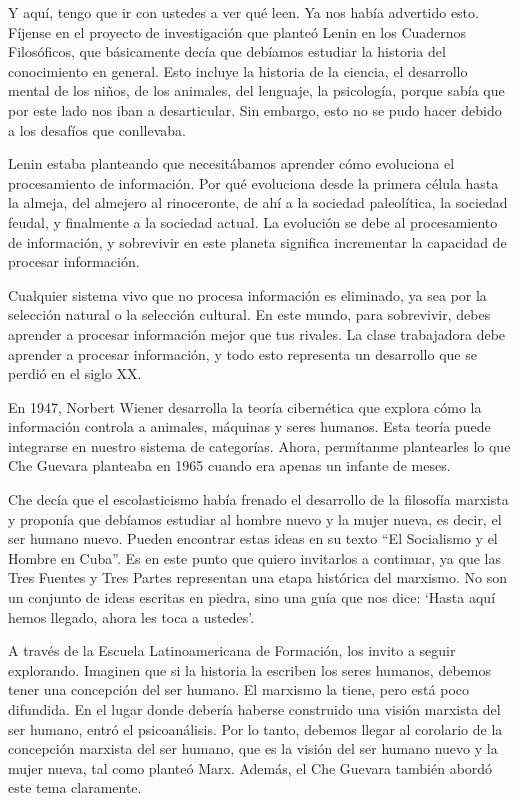 \documentclass[
  jou,
  floatsintext,
  longtable,
  a4paper,
  nolmodern,
  notxfonts,
  notimes,
  12pt,
  colorlinks=true,linkcolor=blue,citecolor=blue,urlcolor=blue]{apa7}
\begin{document}
Y aquí, tengo que ir con ustedes a ver qué leen. Ya nos había advertido
esto. Fíjense en el proyecto de investigación que planteó Lenin en los
Cuadernos Filosóficos, que básicamente decía que debíamos estudiar la
historia del conocimiento en general. Esto incluye la historia de la
ciencia, el desarrollo mental de los niños, de los animales, del
lenguaje, la psicología, porque sabía que por este lado nos iban a
desarticular. Sin embargo, esto no se pudo hacer debido a los desafíos
que conllevaba.

Lenin estaba planteando que necesitábamos aprender cómo evoluciona el
procesamiento de información. Por qué evoluciona desde la primera célula
hasta la almeja, del almejero al rinoceronte, de ahí a la sociedad
paleolítica, la sociedad feudal, y finalmente a la sociedad actual. La
evolución se debe al procesamiento de información, y sobrevivir en este
planeta significa incrementar la capacidad de procesar información.

Cualquier sistema vivo que no procesa información es eliminado, ya sea
por la selección natural o la selección cultural. En este mundo, para
sobrevivir, debes aprender a procesar información mejor que tus rivales.
La clase trabajadora debe aprender a procesar información, y todo esto
representa un desarrollo que se perdió en el siglo XX.

En 1947, Norbert Wiener desarrolla la teoría cibernética que explora
cómo la información controla a animales, máquinas y seres humanos. Esta
teoría puede integrarse en nuestro sistema de categorías. Ahora,
permítanme plantearles lo que Che Guevara planteaba en 1965 cuando era
apenas un infante de meses.

Che decía que el escolasticismo había frenado el desarrollo de la
filosofía marxista y proponía que debíamos estudiar al hombre nuevo y la
mujer nueva, es decir, el ser humano nuevo. Pueden encontrar estas ideas
en su texto ``El Socialismo y el Hombre en Cuba''. Es en este punto que
quiero invitarlos a continuar, ya que las Tres Fuentes y Tres Partes
representan una etapa histórica del marxismo. No son un conjunto de
ideas escritas en piedra, sino una guía que nos dice: `Hasta aquí hemos
llegado, ahora les toca a ustedes'.

A través de la Escuela Latinoamericana de Formación, los invito a seguir
explorando. Imaginen que si la historia la escriben los seres humanos,
debemos tener una concepción del ser humano. El marxismo la tiene, pero
está poco difundida. En el lugar donde debería haberse construido una
visión marxista del ser humano, entró el psicoanálisis. Por lo tanto,
debemos llegar al corolario de la concepción marxista del ser humano,
que es la visión del ser humano nuevo y la mujer nueva, tal como planteó
Marx. Además, el Che Guevara también abordó este tema claramente.
\end{document}
